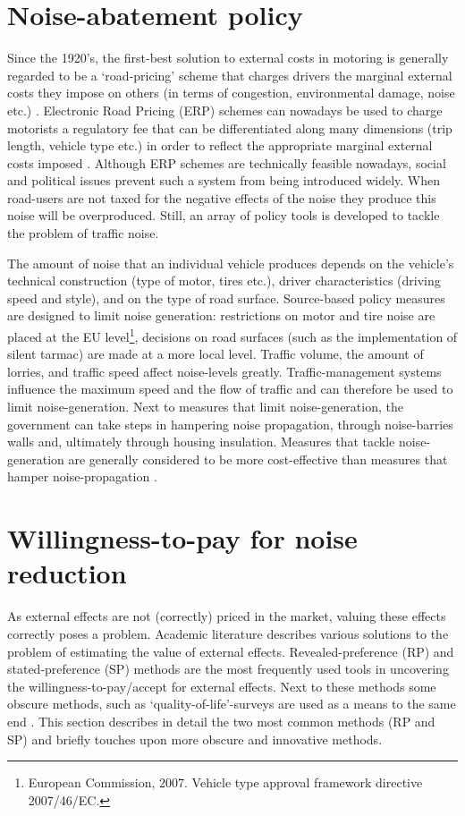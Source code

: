 \documentclass[a4paper]{scrartcl}
\begin{document}
\section{Noise-abatement policy}
Since the 1920’s, the first-best solution to external costs in motoring is generally regarded to be a ‘road-pricing’ scheme that charges drivers the marginal external costs they impose on others (in terms of congestion, environmental damage, noise etc.) \citep{Pigou1924}. Electronic Road Pricing (ERP) schemes can nowadays be used to charge motorists a regulatory fee that can be differentiated along many dimensions (trip length, vehicle type etc.) in order to reflect the appropriate marginal external costs imposed \citep{Verhoef1995}. Although ERP schemes are technically feasible nowadays, social and political issues prevent such a system from being introduced widely. When road-users are not taxed for the negative effects of the noise they produce this noise will be overproduced. Still, an array of policy tools is developed to tackle the problem of traffic noise.

The amount of  noise that an individual vehicle produces depends on the vehicle’s technical construction (type of motor, tires etc.), driver characteristics (driving speed and style), and on the type of road surface. Source-based policy measures are designed to limit noise generation: restrictions on motor and tire noise are placed at the EU level\footnote{European Commission, 2007.  Vehicle type approval framework directive 2007/46/EC.}, decisions on road surfaces (such as the implementation of silent tarmac) are made at a more local level. Traffic volume, the amount of lorries, and traffic speed affect noise-levels greatly. Traffic-management systems influence the maximum speed and the flow of traffic and can therefore be used to limit noise-generation. Next to measures that limit noise-generation, the government can take steps in hampering noise propagation, through noise-barries walls and, ultimately through housing insulation.  Measures that tackle noise-generation are generally considered to be more cost-effective than measures that hamper noise-propagation \citep{DanishRoadInstituteDRI2005,DenBoer2007}.

\section{Willingness-to-pay for noise reduction}

As external effects are not (correctly) priced in the market, valuing these effects correctly poses a problem. Academic literature describes various solutions to the problem of estimating the value of external effects. Revealed-preference (RP) and stated-preference (SP) methods are the most frequently used tools in uncovering the willingness-to-pay/accept for external effects. Next to these methods some obscure methods, such as ‘quality-of-life’-surveys are used as a means to the same end \citep{VanPraag2001}. This section describes in detail the two most common methods (RP and SP) and briefly touches upon more obscure and innovative methods.
\end{document}
